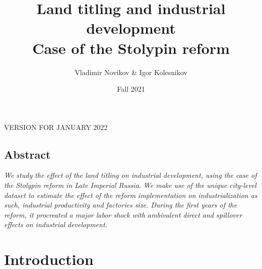 \documentclass[a4paper, 12pt]{article}
\title{%
Land titling and industrial development\\
\Large Case of the Stolypin reform}
\author{Vladimir Novikov \& Igor Kolesnikov}
\date{Fall 2021}
\begin{document}
\maketitle

\noindent VERSION FOR JANUARY 2022

\subsection*{Abstract}

\textit{We study the effect of the land titling on industrial development, using the case of the Stolypin reform in Late Imperial Russia. We make use of the unique city-level dataset to estimate the effect of the reform implementation on industrialization as such, industrial productivity and factories size. During the first years of the reform, it procreated a major labor shock with ambivalent direct and spillover effects on industrial development.}

\newpage

\section{Introduction}
\end{document}
